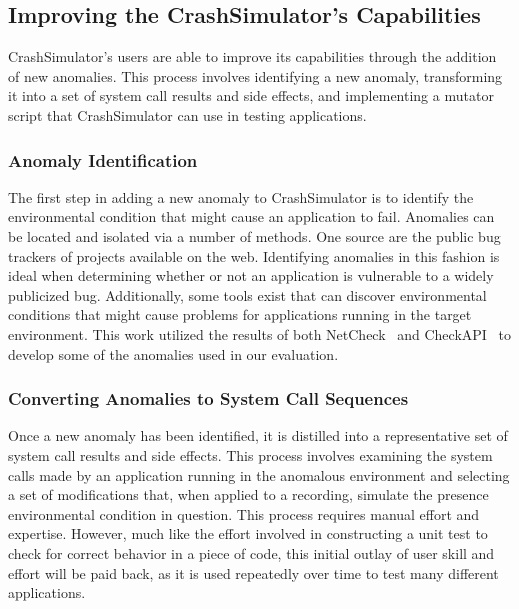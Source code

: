 \subsection{Improving the CrashSimulator's Capabilities}
\label{sec-improving-tool}

CrashSimulator's users are able to improve its capabilities through
the addition of new anomalies.  This process involves identifying a new
anomaly, transforming it into a set of system call results and side
effects, and implementing a mutator script that CrashSimulator can use in
testing applications.

\subsubsection{Anomaly Identification} \label{subsec:anomalyidentification}

The first step in adding a new anomaly to CrashSimulator is to identify the
environmental condition that might cause an application to fail.
Anomalies can be located and isolated via a number of methods. One source
are the public bug trackers of projects available on the web.
Identifying anomalies in this fashion is ideal when determining
whether or not an application is vulnerable to a widely publicized bug.
Additionally, some tools exist that can discover environmental conditions
that might cause problems
for applications
running in the target environment.  This
work utilized the results of both NetCheck~\cite{Zhuang_NSDI_2014} and
CheckAPI~\cite{rasley2015detecting}
to develop some of the
anomalies used in our evaluation.

\subsubsection{Converting Anomalies to System Call Sequences}

Once a new anomaly has been identified, it is distilled into a
representative set of system call results and side effects.
This process involves examining the
system calls made by an application running in the anomalous environment
and selecting a set of modifications that, when applied to a recording,
simulate the presence environmental condition in question.
This process requires manual effort and expertise.  However,
much like
the effort involved in constructing a unit test to check for correct
behavior in a piece of code, this initial outlay of
user skill and effort will be paid back, as it is
used repeatedly over time to test many different applications.

